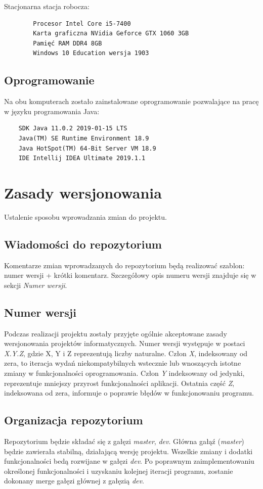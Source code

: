 \documentclass{article}
\begin{document}
    Stacjonarna stacja robocza:
    
\begin{verbatim}
        Procesor Intel Core i5-7400
        Karta graficzna NVidia Geforce GTX 1060 3GB
        Pamięć RAM DDR4 8GB
        Windows 10 Education wersja 1903
\end{verbatim}

\subsection{Oprogramowanie}

Na obu komputerach zostało zainstalowane oprogramowanie pozwalające na pracę w języku programowania Java:

\begin{verbatim}
    SDK Java 11.0.2 2019-01-15 LTS
    Java(TM) SE Runtime Environment 18.9
    Java HotSpot(TM) 64-Bit Server VM 18.9
    IDE Intellij IDEA Ultimate 2019.1.1 
\end{verbatim}

\section{Zasady wersjonowania}
Ustalenie sposobu wprowadzania zmian do projektu.

\subsection{Wiadomości do repozytorium}
Komentarze zmian wprowadzanych do repozytorium będą realizować szablon: numer wersji + krótki komentarz. Szczegółowy opis numeru wersji znajduje się w sekcji \textit{Numer wersji}.

\subsection{Numer wersji}
Podczas realizacji projektu zostały przyjęte ogólnie akceptowane zasady wersjonowania projektów informatycznych. Numer wersji występuje w postaci \textit{X.Y.Z}, gdzie X, Y i Z reprezentują liczby naturalne. Człon \textit{X}, indeksowany od zera, to iteracja wydań niekompatybilnych wstecznie lub wnoszących istotne zmiany w funkcjonalności oprogramowania. Człon \textit{Y} indeksowany od jedynki, reprezentuje mniejszy przyrost funkcjonalności aplikacji. Ostatnia część \textit{Z}, indeksowana od zera, informuje o poprawie błędów w funkcjonowaniu programu.

\subsection{Organizacja repozytorium}
Repozytorium będzie składać się z gałęzi \textit{master}, \textit{dev}. Główna gałąź (\textit{master}) będzie zawierała stabilną, działającą wersję projektu. Wszelkie zmiany i dodatki funkcjonalności bedą rozwijane w gałęzi \textit{dev}. Po poprawnym zaimplementowaniu określonej funkcjonalności i uzyskaniu kolejnej iteracji programu, zostanie dokonany merge gałęzi głównej z gałęzią \textit{dev}.
\end{document}
